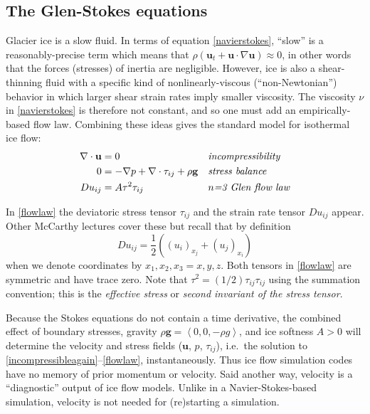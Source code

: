 \documentclass[letterpaper,final,12pt,reqno]{amsart}
\newcommand{\bu}{\mathbf{u}}
\begin{document}
\subsection*{The Glen-Stokes equations}  Glacier ice is a slow fluid.  In terms of equation \eqref{navierstokes}, ``slow'' is a reasonably-precise term which means that $\rho \left(\mathbf{u}_t + \mathbf{u}\cdot\nabla \mathbf{u}\right) \approx 0$, in other words that the forces (stresses) of inertia are negligible.  However, ice is also a shear-thinning fluid with a specific kind of nonlinearly-viscous (``non-Newtonian'') behavior in which larger shear strain rates imply smaller viscosity.  The viscosity $\nu$ in \eqref{navierstokes} is therefore not constant, and so one must add an empirically-based flow law.  Combining these ideas gives the standard model for isothermal ice flow:
\begin{align}
\nabla \cdot \mathbf{u} &= 0 &&\text{\emph{incompressibility}} \label{incompressibleagain} \\
0 &= - \nabla p + \nabla \cdot \tau_{ij} + \rho \mathbf{g} &&\text{\emph{stress balance}} \label{forcebalance} \\
Du_{ij} &= A \tau^2 \tau_{ij} &&\text{\emph{$n$=3 Glen flow law}} \label{flowlaw}
\end{align}

In \eqref{flowlaw} the deviatoric stress tensor $\tau_{ij}$ and the strain rate tensor $Du_{ij}$ appear.  Other McCarthy lectures cover these but recall that by definition
    $$Du_{ij} = \frac{1}{2} \left((u_i)_{x_j}+(u_j)_{x_i}\right)$$
when we denote coordinates by $x_1,x_2,x_3=x,y,z$.  Both tensors in \eqref{flowlaw} are symmetric and have trace zero.  Note that $\tau^2 = (1/2) \tau_{ij} \tau_{ij}$ using the summation convention; this is the \emph{effective stress} or \emph{second invariant of the stress tensor}.

Because the Stokes equations do not contain a time derivative, the combined effect of boundary stresses, gravity $\rho \mathbf{g} = \left<0,0,-\rho g\right>$, and ice softness $A>0$ will determine the velocity and stress fields ($\bu$, $p$, $\tau_{ij}$), i.e.~the solution to \eqref{incompressibleagain}--\eqref{flowlaw}, instantaneously.  Thus ice flow simulation codes have no memory of prior momentum or velocity.  Said another way, velocity is a ``diagnostic'' output of ice flow models.  Unlike in a Navier-Stokes-based simulation, velocity is not needed for (re)starting a simulation.
\end{document}
